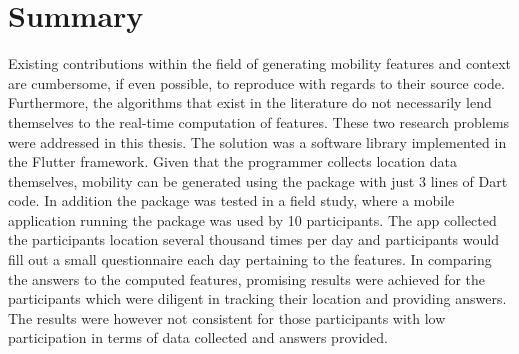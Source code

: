 \chapter{Summary}
Existing contributions within the field of generating mobility features and context are cumbersome, if even possible, to reproduce with regards to their source code. Furthermore, the algorithms that exist in the literature do not necessarily lend themselves to the real-time computation of features. These two research problems were addressed in this thesis. The solution was a software library implemented in the Flutter framework. Given that the programmer collects location data themselves, mobility can be generated using the package with just 3 lines of Dart code. In addition the package was tested in a field study, where a mobile application running the package was used by 10 participants. The app collected the participants location several thousand times per day and participants would fill out a small questionnaire each day pertaining to the features. In comparing the answers to the computed features, promising results were achieved for the participants which were diligent in tracking their location and providing answers. The results were however not consistent for those participants with low participation in terms of data collected and answers provided.
